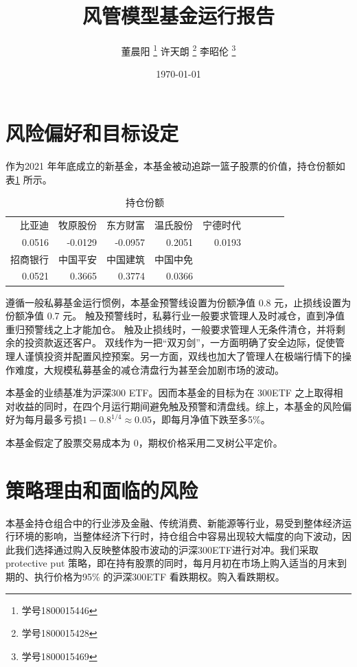 \documentclass[a4paper,12pt]{ctexart}
\author{董晨阳 \thanks{学号1800015446} 许天朗 \thanks{学号1800015428} 李昭伦 \thanks{学号1800015469}}
\date{\today}
\title{风管模型基金运行报告}
\begin{document}
\maketitle
\tableofcontents
\section{风险偏好和目标设定}
作为2021 年年底成立的新基金，本基金被动追踪一篮子股票的价值，持仓份额如表\ref{holdings} 所示。
\begin{table}[ht]
	\begin{tabular}{rrrrrrrrr}
		比亚迪    & 牧原股份    & 东方财富    & 温氏股份   & 宁德时代   \\
		0.0516 & -0.0129 & -0.0957 & 0.2051 & 0.0193 \\
		招商银行   & 中国平安    & 中国建筑    & 中国中免            \\
		0.0521 & 0.3665  & 0.3774  & 0.0366          \\
	\end{tabular}
	\caption{持仓份额}
	\label{holdings}
\end{table}

遵循一般私募基金运行惯例，本基金预警线设置为份额净值 0.8 元，止损线设置为份额净值 0.7 元。
触及预警线时，私募行业一般要求管理人及时减仓，直到净值重归预警线之上才能加仓。
触及止损线时，一般要求管理人无条件清仓，并将剩余的投资款返还客户。
双线作为一把“双刃剑”，一方面明确了安全边际，促使管理人谨慎投资并配置风控预案。另一方面，双线也加大了管理人在极端行情下的操作难度，大规模私募基金的减仓清盘行为甚至会加剧市场的波动。

本基金的业绩基准为沪深300 ETF。因而本基金的目标为在 300ETF 之上取得相对收益的同时，在四个月运行期间避免触及预警和清盘线。综上，本基金的风险偏好为每月最多亏损\(1-0.8^{1/4}\approx 0.05\)，即每月净值下跌至多5\%。

本基金假定了股票交易成本为 0，期权价格采用二叉树公平定价。
\section{策略理由和面临的风险}
本基金持仓组合中的行业涉及金融、传统消费、新能源等行业，易受到整体经济运行环境的影响，当整体经济下行时，持仓组合中容易出现较大幅度的向下波动，因此我们选择通过购入反映整体股市波动的沪深300ETF进行对冲。我们采取 protective put 策略，即在持有股票的同时，每月月初在市场上购入适当的月末到期的、执行价格为95\% 的沪深300ETF 看跌期权。购入看跌期权。
\end{document}
